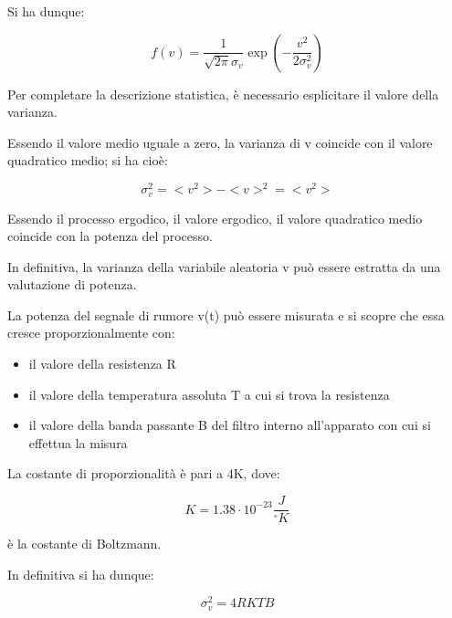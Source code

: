 Si ha dunque: 

{
    \Large 
    \begin{equation}
        f(v) = \frac{1}{\sqrt{2 \pi} \sigma_v } \exp(- \frac{v^{2}}{2 \sigma_v ^{2}})
    \end{equation}
}

Per completare la descrizione statistica, è necessario esplicitare il valore della varianza. \newline 

Essendo il valore medio uguale a zero, la varianza di v coincide con il valore quadratico medio; si ha cioè: 

{
    \Large 
    \begin{equation}
        \sigma_v ^{2} = <v^{2}> - <v>^{2} = <v^{2}>
    \end{equation}
}

Essendo il processo ergodico, il valore ergodico, il valore quadratico medio coincide con la potenza del processo. \newline 

In definitiva, la varianza della variabile aleatoria v può essere estratta da una valutazione di potenza. \newline 

La potenza del segnale di rumore v(t) può essere misurata e si scopre che essa cresce proporzionalmente con: 

\begin{itemize}
    \item il valore della resistenza R 
    \item il valore della temperatura assoluta T a cui si trova la resistenza 
    \item il valore della banda passante B del filtro interno all'apparato con cui si effettua la misura 
\end{itemize} 

La costante di proporzionalità è pari a 4K, dove: 

{
    \Large 
    \begin{equation}
        K = 1.38 \cdot 10^{-23} \frac{J}{^{\circ} K}
    \end{equation}
}

è la costante di Boltzmann. \newline 

In definitiva si ha dunque: 

{
    \Large 
    \begin{equation}
        \sigma_v ^{2} = 4RKTB 
    \end{equation}
}


